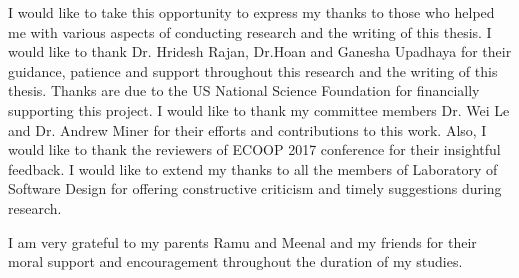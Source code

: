 I would like to take this opportunity to express my thanks to those who helped me with various
aspects of conducting research and the writing of this thesis. I would like to thank Dr. Hridesh Rajan, Dr.Hoan and Ganesha Upadhaya
for their guidance, patience and support throughout this research and the writing of this thesis. Thanks
are due to the US National Science Foundation for financially supporting this project.
I would like to thank my committee members Dr. Wei Le and Dr. Andrew Miner for their
efforts and contributions to this work. Also, I would like to thank the reviewers of ECOOP 2017 conference for their insightful feedback. I would like to extend my thanks to all the members of Laboratory of Software Design for offering constructive criticism and timely suggestions
during research.
\par I am very grateful to my parents Ramu and Meenal and my friends for their moral support and encouragement throughout the duration of my studies.